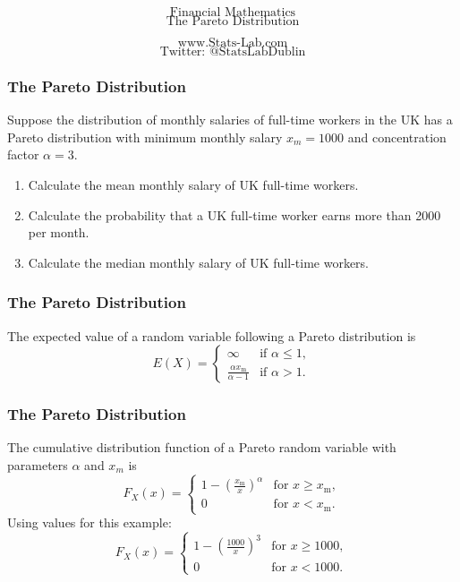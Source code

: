 \documentclass{beamer}
\begin{document}
\begin{frame}
\bigskip
{
\Huge
\[ \mbox{Financial Mathematics}  \]
\huge
\[ \mbox{The Pareto Distribution}  \]
}

{
\LARGE
\[ \mbox{www.Stats-Lab.com}  \]
\[ \mbox{Twitter: @StatsLabDublin} \]
}
\end{frame}
\begin{frame}
\frametitle{The Pareto Distribution}
\Large

Suppose the distribution of monthly salaries of full-time workers in the UK has
a Pareto distribution with minimum monthly salary $x_m = 1000$ and concentration
factor $\alpha = 3$. 

\begin{enumerate}
\item Calculate the mean monthly salary of UK full-time workers.
\item Calculate the probability that a UK full-time worker earns more than 2000 per month.
\item Calculate the median monthly salary of UK full-time workers.
\end{enumerate}
\end{frame}

\begin{frame}
\frametitle{The Pareto Distribution}
\Large
\vspace{-2cm}
The expected value of a random variable following a Pareto distribution is
\[E(X)= \begin{cases} \infty & \text{if }\alpha\le 1, \\ \frac{\alpha x_\mathrm{m}}{\alpha-1} & \text{if }\alpha>1. \end{cases}
\]
\end{frame}
\begin{frame}
\frametitle{The Pareto Distribution}
\Large
\vspace{-1.2cm}
The cumulative distribution function of a Pareto random variable with parameters $\alpha$ and $x_m$ is
\[
F_X(x) = \begin{cases}
1-\left(\frac{x_\mathrm{m}}{x}\right)^\alpha & \text{for } x \ge x_\mathrm{m}, \\
0 & \text{for }x < x_\mathrm{m}.
\end{cases}
\]
Using values for this example:
\[
F_X(x) = \begin{cases}
1-\left(\frac{1000}{x}\right)^3 & \text{for } x \ge 1000, \\
0 & \text{for }x < 1000.
\end{cases}
\]
\end{frame}
\end{document}
